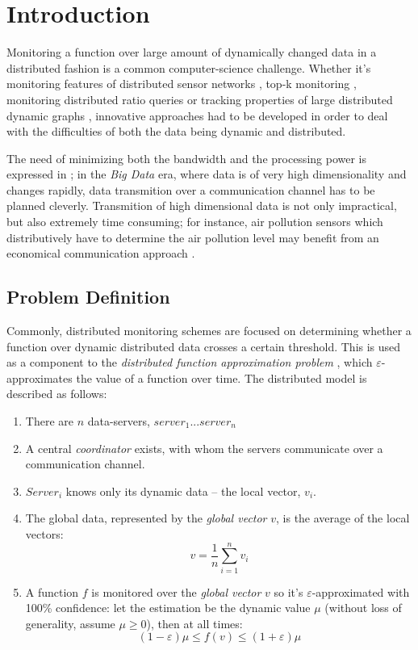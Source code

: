 \documentclass[11pt, conference]{article}
\begin{document}
\section{Introduction}

Monitoring a function over large amount of dynamically changed data in a distributed fashion is a common computer-science challenge. Whether it's monitoring features of distributed sensor networks \cite{burdakis2012detecting}, top-k monitoring \cite{babcock2003distributed}, monitoring distributed ratio queries \cite{gupta2013ratio} or tracking properties of large distributed dynamic graphs \cite{mcgregor2015densest}, innovative approaches had to be developed in order to deal with the difficulties of both the data being dynamic and distributed.

The need of minimizing both the bandwidth and the processing power is expressed in \cite{giatrakos2013network}; in the \textit{Big Data} era, where data is of very high dimensionality and changes rapidly, data transmition over a communication channel has to be planned cleverly. Transmition of high dimensional data is not only impractical, but also extremely time consuming; for instance, air pollution sensors which distributively have to determine the air pollution level may benefit from an economical communication approach \cite{cheng2004revised}.

\subsection{Problem Definition}

Commonly, distributed monitoring schemes are focused on determining whether a function over dynamic distributed data crosses a certain threshold. This is used as a component to the \textit{distributed function approximation problem} \cite{garofalakis2013sketch}, which $\varepsilon$-approximates the value of a function over time. The distributed model is described as follows:
\begin{enumerate}
\item There are $n$ data-servers, $server_1 ... server_n$
\item A central \textit{coordinator} exists, with whom the servers communicate over a communication channel.
\item $Server_i$ knows only its dynamic data -- the local vector, $v_i$.
\item The global data, represented by the \textit{global vector} $v$, is the average of the local vectors:
\begin{equation}
v = \frac{1}{n}\sum\limits_{i=1}^n {v_i}
\end{equation}
\item A function $f$ is monitored over the \textit{global vector} $v$ so it's $\varepsilon$-approximated with 100\% confidence: let the estimation be the dynamic value $\mu$ (without loss of generality, assume ${\mu \geq 0}$), then at all times: 
\begin{equation}
(1-\varepsilon )\mu \leq f(v) \leq (1+\varepsilon )\mu
\end{equation}
\end{enumerate}
\end{document}
